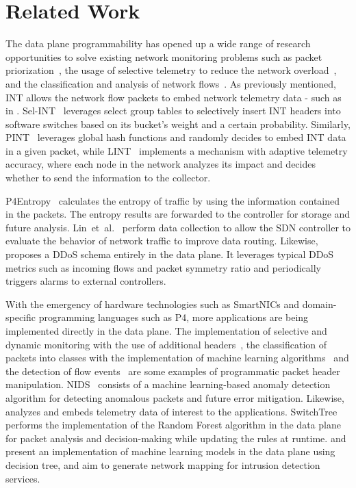 \section{Related Work}
The data plane programmability has opened up a wide range of research opportunities to solve existing network monitoring problems such as packet priorization~\cite{tr19_p4_int_vnf}, the usage of selective telemetry to reduce the network overload~\cite{tr18_selective_in-band}, and the classification and analysis of network flows~\cite{tr19_flowstalker}. As previously mentioned, INT allows the network flow packets to embed network telemetry data - such as in \cite{tang2019sel,ben2020pint,tr21_lint}.
%
Sel-INT~\cite{tang2019sel} leverages select group tables to selectively insert INT headers into software switches based on its bucket's weight and a certain probability.
%
Similarly, PINT~\cite{ben2020pint} leverages global hash functions and randomly decides to embed INT data in a given packet,
%
while LINT~\cite{tr21_lint} implements a mechanism with adaptive telemetry accuracy, where each node in the network analyzes its impact and decides whether to send the information to the collector.

P4Entropy~\cite{tr20_estimating_log} calculates the entropy of traffic by using the information contained in the packets. The entropy results are forwarded to the controller for storage and future analysis. Lin~et~al.~\cite{tr21_network_telemetry_by} perform data collection to allow the SDN controller to evaluate the behavior of network traffic to improve data routing.
%
Likewise, \cite{tr20_multi-feature} proposes a DDoS schema entirely in the data plane. It leverages typical DDoS metrics such as incoming flows and packet symmetry ratio and periodically triggers alarms to external controllers.

With the emergency of hardware technologies such as SmartNICs and domain-specific programming languages such as P4, more applications are being implemented directly in the data plane. The implementation of selective and dynamic monitoring with the use of additional headers~\cite{tr19_sampling-based}, the classification of packets into classes with the implementation of machine learning algorithms~\cite{tr19_do_switches_dream} and the detection of flow events~\cite{tr20_flow_event} are some examples of programmatic packet header manipulation.
%
NIDS~\cite{tr20_anomaly_detection} consists of a machine learning-based anomaly detection algorithm for detecting anomalous packets and future error mitigation. Likewise, \cite{tr20_detection_of_fog} analyzes and embeds telemetry data of interest to the applications. SwitchTree \cite{tr20_switchtree} performs the implementation of the Random Forest algorithm in the data plane for packet analysis and decision-making while updating the rules at runtime. \cite{tr21_programmable_sw} and \cite{tr19_do_switches_dream, tr20_switchtree} present an implementation of machine learning models in the data plane using decision tree, and aim to generate network mapping for intrusion detection services.

